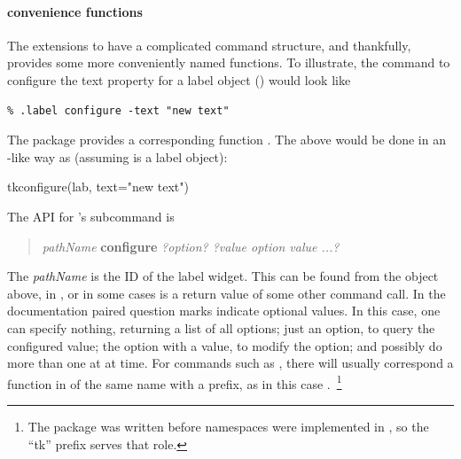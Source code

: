 \paragraph{ convenience functions}
The \TK\/ extensions to \TCL\/ have a complicated command structure,
and thankfully,  provides some more conveniently named
functions. To illustrate, the \TCL\/ command to configure the text property for
a label object () would look like
\begin{verbatim}
% .label configure -text "new text"
\end{verbatim}
The  package provides a corresponding function
. The above would be done in an \R-like way as (assuming  is a
label object):


\begin{Schunk}
\begin{Sinput}
 tkconfigure(lab, text="new text")
\end{Sinput}
\end{Schunk}




The \TK\/ API for 's  subcommand is

\begin{quotation}
  \textit{pathName} \textbf{configure} \textit{?option? ?value option value ...?}
\end{quotation}

The \textit{pathName} is the ID of the label widget. This can be found
from the object  above, in , or in some cases is a
return value of some other command call.  In the \TK\/ documentation
paired question marks indicate optional values. In this case, one can
specify nothing, returning a list of all options; just an option, to
query the configured value; the option with a value, to modify the
option; and possibly do more than one at at time.  For commands such
as , there will usually correspond a function in
\R\/ of the same name with a  prefix, as in this case
.~\footnote{The package  was written before
namespaces were implemented in \R, so the ``tk'' prefix serves that role.}

